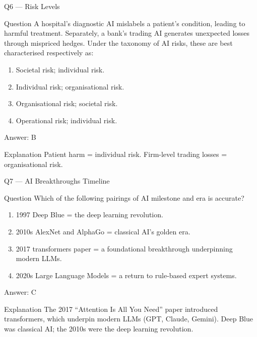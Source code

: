 \documentclass[aspectratio=169,8pt]{beamer}
\begin{document}
	\begin{frame}{Q6 --- Risk Levels}
		\begin{block}{Question}
			A hospital's diagnostic AI mislabels a patient's condition, leading to harmful treatment. Separately, a bank's trading AI generates unexpected losses through mispriced hedges. Under the taxonomy of AI risks, these are best characterised respectively as:
		\end{block}
		\begin{enumerate}
			\item Societal risk; individual risk.
			\item Individual risk; organisational risk.
			\item Organisational risk; societal risk.
			\item Operational risk; individual risk.
		\end{enumerate}
		\begin{exampleblock}{Answer: B}\end{exampleblock}
		\begin{block}{Explanation}
			Patient harm = individual risk. Firm-level trading losses = organisational risk.
		\end{block}
	\end{frame}
	
	\begin{frame}{Q7 --- AI Breakthroughs Timeline}
		\begin{block}{Question}
			Which of the following pairings of AI milestone and era is accurate?
		\end{block}
		\begin{enumerate}
			\item 1997 Deep Blue = the deep learning revolution.
			\item 2010s AlexNet and AlphaGo = classical AI's golden era.
			\item 2017 transformers paper = a foundational breakthrough underpinning modern LLMs.
			\item 2020s Large Language Models = a return to rule-based expert systems.
		\end{enumerate}
		\begin{exampleblock}{Answer: C}\end{exampleblock}
		\begin{block}{Explanation}
			The 2017 ``Attention Is All You Need'' paper introduced transformers, which underpin modern LLMs (GPT, Claude, Gemini). Deep Blue was classical AI; the 2010s were the deep learning revolution.
		\end{block}
	\end{frame}
	
\end{document}
